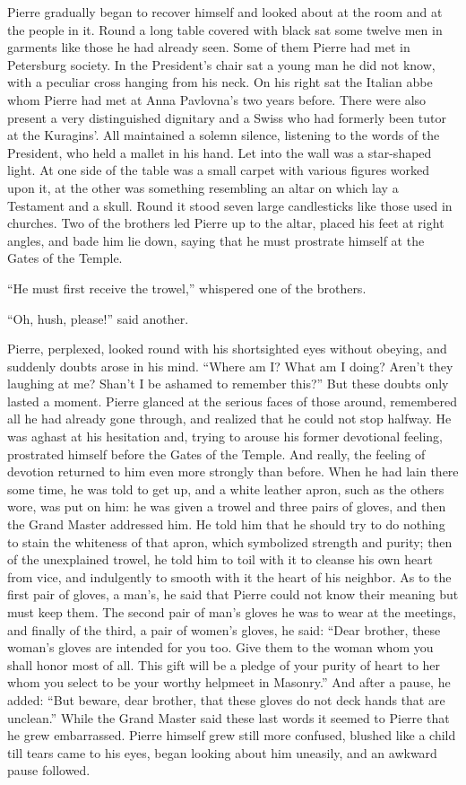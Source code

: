 Pierre gradually began to recover himself and looked about at the
room and at the people in it. Round a long table covered with
black sat some twelve men in garments like those he had already
seen. Some of them Pierre had met in Petersburg society. In the
President's chair sat a young man he did not know, with a
peculiar cross hanging from his neck.  On his right sat the
Italian abbe whom Pierre had met at Anna Pavlovna's two years
before. There were also present a very distinguished dignitary
and a Swiss who had formerly been tutor at the Kuragins'. All
maintained a solemn silence, listening to the words of the
President, who held a mallet in his hand. Let into the wall was a
star-shaped light. At one side of the table was a small carpet
with various figures worked upon it, at the other was something
resembling an altar on which lay a Testament and a skull. Round
it stood seven large candlesticks like those used in
churches. Two of the brothers led Pierre up to the altar, placed
his feet at right angles, and bade him lie down, saying that he
must prostrate himself at the Gates of the Temple.

``He must first receive the trowel,'' whispered one of the
brothers.

``Oh, hush, please!'' said another.

Pierre, perplexed, looked round with his shortsighted eyes
without obeying, and suddenly doubts arose in his mind. ``Where
am I? What am I doing? Aren't they laughing at me? Shan't I be
ashamed to remember this?'' But these doubts only lasted a
moment. Pierre glanced at the serious faces of those around,
remembered all he had already gone through, and realized that he
could not stop halfway. He was aghast at his hesitation and,
trying to arouse his former devotional feeling, prostrated
himself before the Gates of the Temple. And really, the feeling
of devotion returned to him even more strongly than before. When
he had lain there some time, he was told to get up, and a white
leather apron, such as the others wore, was put on him: he was
given a trowel and three pairs of gloves, and then the Grand
Master addressed him. He told him that he should try to do
nothing to stain the whiteness of that apron, which symbolized
strength and purity; then of the unexplained trowel, he told him
to toil with it to cleanse his own heart from vice, and
indulgently to smooth with it the heart of his neighbor. As to
the first pair of gloves, a man's, he said that Pierre could not
know their meaning but must keep them. The second pair of man's
gloves he was to wear at the meetings, and finally of the third,
a pair of women's gloves, he said: ``Dear brother, these woman's
gloves are intended for you too. Give them to the woman whom you
shall honor most of all. This gift will be a pledge of your
purity of heart to her whom you select to be your worthy helpmeet
in Masonry.'' And after a pause, he added: ``But beware, dear
brother, that these gloves do not deck hands that are unclean.''
While the Grand Master said these last words it seemed to Pierre
that he grew embarrassed. Pierre himself grew still more
confused, blushed like a child till tears came to his eyes, began
looking about him uneasily, and an awkward pause followed.

